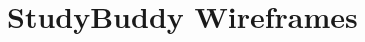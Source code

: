 \documentclass[a4paper,11pt]{article}
\begin{document}
\section*{StudyBuddy Wireframes}

\end{document}
